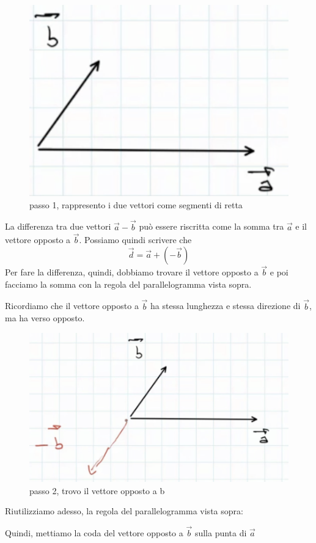 \documentclass[a4paper]{book}
\begin{document}
\begin{figure}[h]
\begin{center}
\includegraphics[width = 0.5 \textwidth]{differenza1}
\caption{passo 1, rappresento i due vettori come segmenti di retta}
\label{fig:differenza1}
\end{center}
\end{figure}

La differenza tra due vettori $\overrightarrow{a} - \overrightarrow{b} $ può essere riscritta come la somma tra $\overrightarrow{a}$ e il vettore opposto a $\overrightarrow{b}$. Possiamo quindi scrivere che
$$\overrightarrow{d} = \overrightarrow{a} + (-\overrightarrow{b}) $$
Per fare la differenza, quindi, dobbiamo trovare il vettore opposto a 
$\overrightarrow{b}$ e poi facciamo la somma con la regola del parallelogramma vista sopra.

Ricordiamo che il vettore opposto a $\overrightarrow{b}$ ha stessa lunghezza e stessa direzione di $\overrightarrow{b}$, ma ha verso opposto.

\begin{figure}[h]
\begin{center}
\includegraphics[width = 0.5 \textwidth]{differenza2}
\caption{passo 2, trovo il vettore opposto a b}
\label{fig:differenza2}
\end{center}
\end{figure}
\newpage
Riutilizziamo adesso, la regola del parallelogramma vista sopra:

Quindi, mettiamo la coda del vettore opposto a $ \overrightarrow{b} $ sulla punta di
$\overrightarrow{a} $
\end{document}
